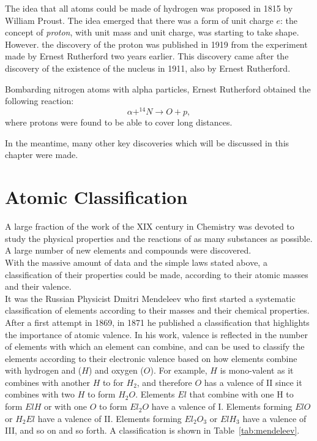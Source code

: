 The idea that all atoms could be made of hydrogen was proposed in 1815 by William Proust. The idea emerged that there was a form of unit charge $e$: the concept of \emph{proton}, with unit mass and unit charge, was starting to take shape. However. the discovery of the proton was published in 1919 from the experiment made by Ernest Rutherford two years earlier. This discovery came after the discovery of the existence of the nucleus in 1911, also by Ernest Rutherford.

\begin{framed}
    \begin{experiment}

Bombarding nitrogen atoms with alpha particles, Ernest Rutherford obtained the following reaction:
		\begin{equation*}\alpha + ^{14}N  \rightarrow  O + p,\end{equation*}
where protons were found to be able to cover long distances.
\end{experiment}

\end{framed}
In the meantime, many other key discoveries which will be discussed in this chapter were made.

\section{Atomic Classification}
A large fraction of the work of the XIX century in Chemistry was devoted to study the physical properties and the reactions of as many substances as possible. A large number of new elements and compounds were discovered. \\

With the massive amount of data and the simple laws stated above, a classification of their properties could be made, according to their atomic masses and their valence. \\

It was the Russian Physicist Dmitri Mendeleev who first started a systematic classification of elements according to their masses and their chemical properties. After a first attempt in 1869, in 1871 he published a classification that highlights the importance of  atomic valence. In his work, valence is reflected in the number of elements with which an element can combine, and can be used to classify the elements according to their electronic valence based on how elements combine with hydrogen and ($H$) and oxygen ($O$). For example, $H$ is mono-valent as it combines with another $H$ to for $H_2$, and therefore $O$ has a valence of II since it combines with two $H$ to form $H_2O$. Elements $El$ that combine with one H to form $ElH$ or with one $O$ to form $El_2O$ have a valence of I. Elements forming $ElO$ or $H_2El$ have a valence of II. Elements forming $El_2O_3$ or $ElH_3$ have a valence of III, and so on and so forth. A classification is shown in Table~\ref{tab:mendeleev}.

